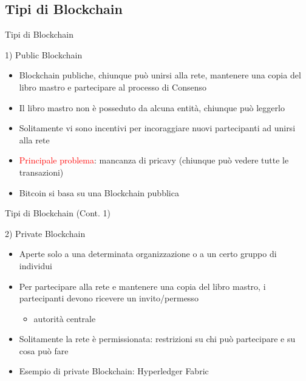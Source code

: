 \documentclass{beamer}
\newcommand\red[1]{\textcolor{red}{#1}}
\begin{document}
  \subsection{Tipi di Blockchain}
  \begin{frame}{Tipi di Blockchain}
    \begin{block}{1) Public Blockchain}
      \begin{itemize}
        \item Blockchain publiche, chiunque può unirsi alla rete, mantenere una copia del libro mastro e partecipare al processo di Consenso 
        \item Il libro mastro non è posseduto da alcuna entità, chiunque può leggerlo
        \item Solitamente vi sono incentivi per incoraggiare nuovi partecipanti ad unirsi alla rete \pause
        \item \red{Principale problema}: mancanza di pricavy (chiunque può vedere tutte le transazioni) \pause
        \item Bitcoin si basa su una Blockchain pubblica
      \end{itemize}
    \end{block}
  \end{frame}




  \begin{frame}{Tipi di Blockchain (Cont. 1)}
    \begin{block}{2) Private Blockchain}
      \begin{itemize}
        \item Aperte solo a una determinata organizzazione o a un certo gruppo di individui
        \item Per partecipare alla rete e mantenere una copia del libro mastro, i partecipanti devono ricevere un invito/permesso
        \begin{itemize}
            \item[\MVRightarrow] autorità centrale
        \end{itemize}
        \item Solitamente la rete è permissionata: restrizioni su chi può partecipare e su cosa può fare
        \item Esempio di private Blockchain: Hyperledger Fabric \cite{hyperledger-fabric}
      \end{itemize}
    \end{block}
  \end{frame}
\end{document}
